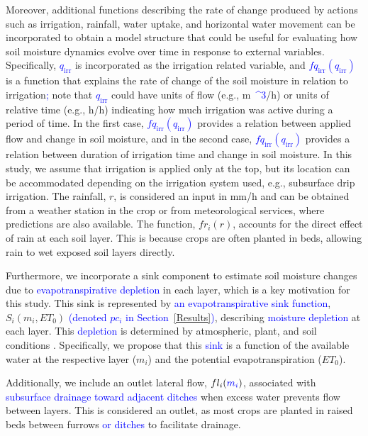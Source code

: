 \documentclass[pdflatex,sn-nature]{sn-jnl}%
\theoremstyle{thmstyleone}%
\theoremstyle{thmstyletwo}%
\theoremstyle{thmstylethree}%
\begin{document}
Moreover, additional functions describing the rate of change produced by actions such as irrigation, rainfall, water uptake, and horizontal water movement can be incorporated to obtain a model structure that could be useful for evaluating how soil moisture dynamics evolve over time in response to external variables. Specifically, \textcolor{blue}{$q_{\mathrm{irr}}$} is incorporated as the irrigation related variable, and \textcolor{blue}{$fq_{\mathrm{irr}}(q_{\mathrm{irr}})$} is a function that explains the rate of change of the soil moisture in relation to irrigation\textcolor{blue}{;} note that \textcolor{blue}{$q_{\mathrm{irr}}$} could have units of flow (e.g., \si{m\textcolor{blue}{^3}/h}) or units of relative time (e.g., \si{h/h}) indicating how much irrigation was active during a period of time. In the first case, \textcolor{blue}{$fq_{\mathrm{irr}}(q_{\mathrm{irr}})$} provides a relation between applied flow and change in soil moisture, and in the second case, \textcolor{blue}{$fq_{\mathrm{irr}}(q_{\mathrm{irr}})$} provides a relation between duration of irrigation time and change in soil moisture. In this study, we assume that irrigation is applied only at the top, but its location can be accommodated depending on the irrigation system used, e.g., subsurface drip irrigation. 
The rainfall, $r$, is considered an input in \si{mm/h} and can be obtained from a weather station in the crop or from meteorological services, where predictions are also available. The function, $fr_i(r)$, accounts for the direct effect of rain at each soil layer. This is because crops are often planted in beds, allowing rain to wet exposed soil layers directly.

Furthermore, we incorporate a sink component to estimate soil moisture changes due to \textcolor{blue}{evapotranspirative depletion} in each layer, which is a key motivation for this study. This sink is represented by \textcolor{blue}{an evapotranspirative sink function}, $S_i (m_i, ET_0)$ \textcolor{blue}{(denoted $pc_i$ in Section~\ref{Results})}, describing \textcolor{blue}{moisture depletion} at each layer. This \textcolor{blue}{depletion} is determined by atmospheric, plant, and soil conditions \cite{swap2024}. Specifically, we propose that this \textcolor{blue}{sink} is a function of the available water at the respective layer ($m_i$) and the potential evapotranspiration ($ET_0$).

Additionally, we include an outlet lateral flow, $fl_i (\textcolor{blue}{m_i})$, associated with \textcolor{blue}{subsurface drainage toward adjacent ditches} when excess water prevents flow between layers. This is considered an outlet, as most crops are planted in raised beds between furrows \textcolor{blue}{or ditches} to facilitate drainage.
\end{document}
